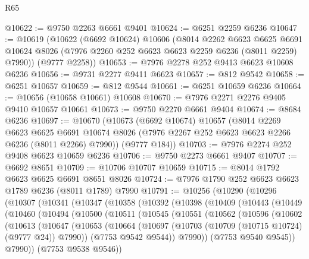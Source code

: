 \begin{lexlean}{R65}
\begin{coremodule}
{@10622 := @9750 @2263 @6661 @9401
@10624 := @6251 @2259 @6236
@10647 := @10619
    (@10622
      (@6692 @10624)
      @10606
      (@8014
        @2262
        @6623
        @6625
        @6691
        @10624
        @8026
        (@7976 @2260 @252 @6623 @6623 @2259 @6236 (@8011 @2259) @7990))
      (@9777 @2258))
@10653 := @7976 @2278 @252 @9413 @6623 @10608 @6236
@10656 := @9731 @2277 @9411 @6623
@10657 := @812 @9542
@10658 := @6251 @10657
@10659 := @812 @9544
@10661 := @6251 @10659 @6236
@10664 := @10656 (@10658 @10661) @10608
@10670 := @7976 @2271 @2276 @9405 @9410 @10657 @10661
@10673 := @9750 @2270 @6661 @9404
@10674 := @8684 @6236
@10697 := @10670
    (@10673
      (@6692 @10674)
      @10657
      (@8014
        @2269
        @6623
        @6625
        @6691
        @10674
        @8026
        (@7976 @2267 @252 @6623 @6623 @2266 @6236 (@8011 @2266) @7990))
      (@9777 @184))
@10703 := @7976 @2274 @252 @9408 @6623 @10659 @6236
@10706 := @9750 @2273 @6661 @9407
@10707 := @6692 @8651
@10709 := @10706 @10707 @10659
@10715 := @8014 @1792 @6623 @6625 @6691 @8651 @8026
@10724 := @7976 @1790 @252 @6623 @6623 @1789 @6236 (@8011 @1789) @7990
@10791 := @10256
    (@10290
      (@10296
        (@10307
          (@10341
            (@10347
              (@10358
                (@10392
                  (@10398
                    (@10409
                      (@10443
                        (@10449
                          (@10460
                            (@10494
                              (@10500
                                (@10511
                                  (@10545
                                    (@10551
                                      (@10562
                                        (@10596
                                          (@10602
                                            (@10613
                                              (@10647
                                                (@10653
                                                  (@10664
                                                    (@10697
                                                      (@10703
                                                        (@10709 (@10715 @10724) (@9777 @24))
                                                        @7990))
                                                    (@7753 @9542 @9544))
                                                  @7990))
                                              (@7753 @9540 @9545))
                                            @7990))
                                        (@7753 @9538 @9546))
}
\end{coremodule}
\end{lexlean}
